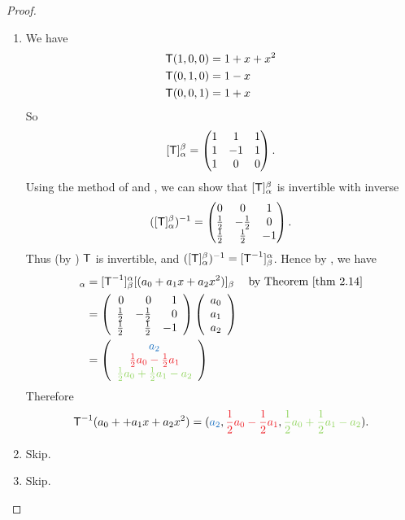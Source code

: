 \begin{proof}
\begin{enumerate}
\item We have
\begin{align*}
    \textsf{T}(1,0,0) & = 1 + x + x^{2} \\
    \textsf{T}(0,1,0) & = 1 - x \\
    \textsf{T}(0,0,1) & = 1 + x \\
\end{align*}
So
\[
    [\textsf{T}]_{\alpha}^{\beta} = \begin{pmatrix}
        1 & 1 & 1 \\ 1 & -1 & 1 \\ 1 & 0 & 0
    \end{pmatrix}.
\]
Using the method of  and , we can show that \([\textsf{T}]_{\alpha}^{\beta}\) is invertible with inverse
\[
    ([\textsf{T}]_{\alpha}^{\beta})^{-1} = \begin{pmatrix}
        0 & 0 & 1 \\
        \frac1{2} & -\frac1{2} & 0 \\
        \frac1{2} & \frac1{2} & -1
    \end{pmatrix}.
\]
Thus (by ) \(\textsf{T}\) is invertible, and \(([\textsf{T}]_{\alpha}^{\beta})^{-1} = [\textsf{T}^{-1}]_{\beta}^{\alpha}\).
Hence by , we have
\begin{align*}
    [\T^{-1}(a_0 + a_1 x + a_2 x^2)]_{\alpha}
        & = [\T^{-1}]_{\beta}^{\alpha} [(a_0 + a_1 x + a_2 x^2)]_{\beta} & \text{by \THM{2.14}} \\
        & = \left(\begin{array}{rrr}
                0 & 0 & 1 \\
                \frac1{2} & -\frac1{2} & 0 \\
                \frac1{2} & \frac1{2} & -1
            \end{array}\right)
            \left(\begin{array}{l}
                a_0 \\ a_1 \\ a_2
            \end{array}\right) \\
        & = \left(\begin{array}{c}
                \BLUE{a_2} \\ \RED{\frac1{2}a_0 - \frac1{2}a_1} \\ \GREEN{\frac1{2}a_0 + \frac1{2}a_1 - a_2}
            \end{array}\right)
\end{align*}
Therefore
\[
    \T^{-1}(a_0 + + a_1 x + a_2 x^2) = (\BLUE{a_2}, \RED{\frac1{2}a_0 - \frac1{2}a_1}, \GREEN{\frac1{2}a_0 + \frac1{2}a_1 - a_2}).
\]

\item Skip.
\item Skip.
\end{enumerate}
\end{proof}

